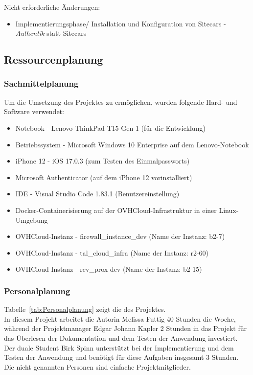 Nicht erforderliche Änderungen:
\begin{itemize} [label=--]
	\item Implementierungsphase/ Installation und Konfiguration von Sitecars - \textit{Authentik} statt Sitecars
\end{itemize}


\subsection{Ressourcenplanung}
\label{sec:Ressourcenplanung}

\subsubsection{Sachmittelplanung}
\label{sec:Sachmittelplanung}
Um die Umsetzung des Projektes zu ermöglichen, wurden folgende Hard- und Software verwendet:
\begin{itemize} [label=--]
	\item Notebook - Lenovo ThinkPad T15 Gen 1 (für die Entwicklung)
	\item Betriebssystem - Microsoft Windows 10 Enterprise auf dem Lenovo-Notebook
	\item iPhone 12 - iOS 17.0.3 (zum Testen des Einmalpassworts)
	\item Microsoft Authenticator (auf dem iPhone 12 vorinstalliert)
	\item \acs{IDE} - Visual Studio Code 1.83.1 (Benutzereinstellung)
	\item Docker-Containerisierung auf der OVHCloud-Infrastruktur in einer Linux-Umgebung
	\item OVHCloud-Instanz - firewall\_instance\_dev (Name der Instanz: b2-7)
	\item OVHCloud-Instanz - tal\_cloud\_infra (Name der Instanz: r2-60)
	\item OVHCloud-Instanz - rev\_prox-dev (Name der Instanz: b2-15)
\end{itemize}

\subsubsection{Personalplanung}
\label{sec:Personalplanung}
Tabelle~\ref{tab:Personalplanung} zeigt die  des Projektes.
\\
In diesem Projekt arbeitet die Autorin Melissa Futtig 40 Stunden die Woche, während der Projektmanager Edgar Johann Kapler 
2 Stunden in das Projekt für das Überlesen der Dokumentation und dem Testen der Anwendung investiert. Der duale Student Birk 
Spinn unterstützt bei der Implementierung und dem Testen der Anwendung und benötigt für diese Aufgaben insgesamt 3 Stunden. 
Die nicht genannten Personen sind einfache Projektmitglieder.

